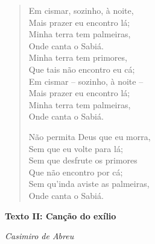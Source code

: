 \begin{myquote}
\begin{verse}
Em cismar, sozinho, à noite, \\
Mais prazer eu encontro lá; \\
Minha terra tem palmeiras, \\
Onde canta o Sabiá. \\

Minha terra tem primores, \\
Que tais não encontro eu cá; \\
Em cismar -- sozinho, à noite -- \\
Mais prazer eu encontro lá; \\
Minha terra tem palmeiras, \\
Onde canta o Sabiá. 

Não permita Deus que eu morra, \\
Sem que eu volte para lá; \\
Sem que desfrute os primores \\
Que não encontro por cá; \\
Sem qu'inda aviste as palmeiras, \\
Onde canta o Sabiá.

\end{verse}


\textbf{Texto II: Canção do exílio}

\emph{Casimiro de Abreu}


\end{myquote}
